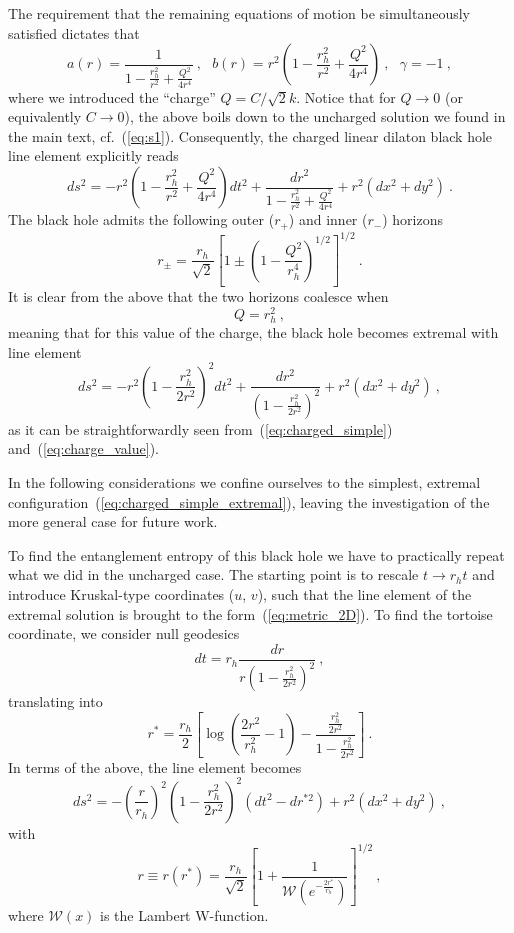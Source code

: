 \documentclass[a4paper, 12pt]{article}
\def\f{\frac}
\def\g{\gamma}
\def\be{\begin{equation}}
\def\ee{\end{equation}}
\begin{document}
The requirement that the remaining equations of motion be simultaneously satisfied dictates that
\be
a(r) = \frac{1}{1-\frac{r_h^2}{r^2}+\frac{Q^2}{4 r^4}}\ ,~~~b(r)=r^2\left(1-\frac{r_h^2}{r^2} + \frac{Q^2}{4 r^4}\right)\ ,~~~\g = -1 \ ,
\ee
where we introduced the ``charge'' $Q=C/\sqrt{2}k$. 
Notice that for $Q\to0$ (or equivalently $C\to 0$), the above  boils down to the uncharged solution we found in the main text, cf.~(\ref{eq:s1}).
Consequently, the charged linear dilaton black hole line element explicitly reads
\be
\label{eq:charged_simple}
ds^2 = -r^2\left(1-\f{r_h^2}{r^2}+\f{Q^2}{4r^4}\right)dt^2 + \frac{dr^2}{1-\f{r_h^2}{r^2}+\f{Q^2}{4r^4}}+r^2 (dx^2+dy^2) \ .  \ee
The black hole admits the following outer ($r_+$) and inner ($r_-$) horizons 
\be
r_{\pm}=\frac{r_h}{\sqrt 2}\left[1\pm \left(1-\frac{Q^2}{r_h^4}\right)^{1/2}\right]^{1/2} \ .
\ee
It is clear from the above that the two horizons coalesce when 
\be
\label{eq:charge_value}
Q=r_h^2 \ ,
\ee
meaning that for this value of the charge, the black hole becomes extremal with line element 
\be
\label{eq:charged_simple_extremal}
ds^2 = -r^2\left(1-\f{r_h^2}{2r^2}\right)^2 dt^2 + \frac{dr^2}{\left(1-\f{r_h^2}{2r^2}\right)^2}+r^2 (dx^2+dy^2) \ ,
\ee
as it can be straightforwardly seen from~(\ref{eq:charged_simple}) and~(\ref{eq:charge_value}). 

In the following considerations we confine ourselves to the simplest, extremal configuration~(\ref{eq:charged_simple_extremal}), leaving the investigation of the more general case for future work.  

To find the entanglement entropy of this black hole we have to  practically repeat what we did in the uncharged case.   The starting point is to rescale $t\to r_h t$ and introduce  Kruskal-type coordinates ($u$, $v$), such that the line element of the extremal solution is brought to the form~(\ref{eq:metric_2D}). To find the tortoise coordinate, we consider null geodesics 
\be
dt = r_h\frac{dr}{r\left(1-\f{r_h^2}{2r^2}\right)^2} \ ,
\ee
translating into 
\be
\label{eq:tort_charged}
r^* 
= \frac {r_h}{2} \left[ \log\left(\frac{2r^2}{r_h^2}-1\right) -  \frac{\frac{r_h^2}{2r^2}}{1-\frac{r_h^2}{2r^2}}  \right] \ .
\ee
In terms of the above, the line element becomes 
\be
ds^2  = -\left(\frac{r}{r_h}\right)^2\left(1-\f{r_h^2}{2r^2}\right)^2 \left(dt^2 -dr^{*2}\right)+r^2\left(dx^2+dy^2\right) \ ,
\ee
with 
\be
r\equiv r(r^*) = \frac{r_h}{\sqrt{2}}\left[1+ \frac{1}{\mathcal W\left(e^{-\frac{2r^*}{r_h}}\right)}\right]^{1/2}\ ,
\ee
where $\mathcal W(x)$ is the Lambert W-function. 
 
\end{document}
